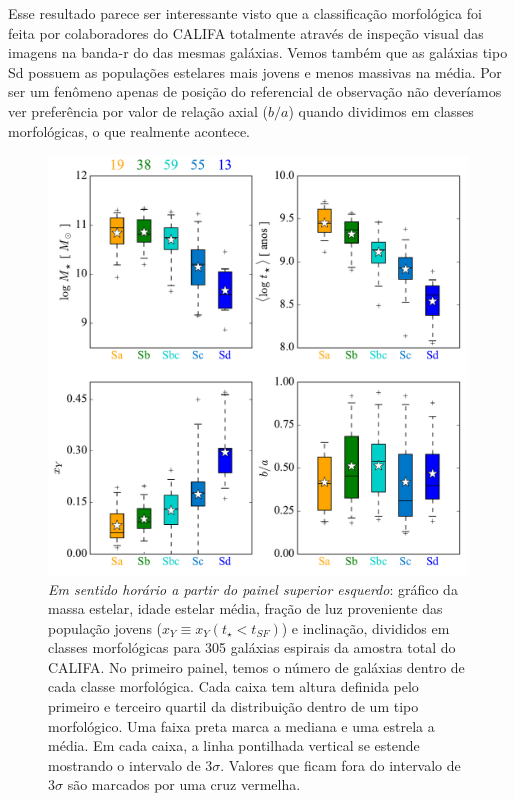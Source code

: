 Esse resultado parece ser interessante visto que a classificação morfológica foi feita por
colaboradores do CALIFA totalmente através de inspeção visual das imagens na banda-r do \SDSS das
mesmas galáxias. Vemos também que as galáxias tipo Sd possuem as populações estelares mais jovens e
menos massivas na média. Por ser um fenômeno apenas de posição do referencial de observação não
deveríamos ver preferência por valor de relação axial ($b/a$) quando dividimos em classes
morfológicas, o que realmente acontece.

\begin{figure}
	\centering
	\includegraphics[width=0.99\textwidth]{figuras/sample_realsample_maskradius_integrated.pdf}
	\caption[Classificação por morfologia.]
	{\emph{Em sentido horário a partir do painel superior esquerdo}: gráfico da massa estelar, idade
	estelar média, fração de luz proveniente das população jovens ($x_Y \equiv x_Y(t_\star < t_{SF})$) e
	inclinação, divididos em classes morfológicas para 305 galáxias espirais da amostra total do
	CALIFA. No primeiro painel, temos o número de galáxias dentro de cada classe morfológica. Cada
	caixa tem altura definida pelo primeiro e terceiro quartil da distribuição dentro de um tipo
	morfológico. Uma faixa preta marca a mediana e uma estrela a média. Em cada caixa, a linha
	pontilhada vertical se estende mostrando o intervalo de $3\sigma$. Valores que ficam fora do
	intervalo de $3\sigma$ são marcados por uma cruz vermelha.}
	\label{fig:amostraMorf}
\end{figure}

